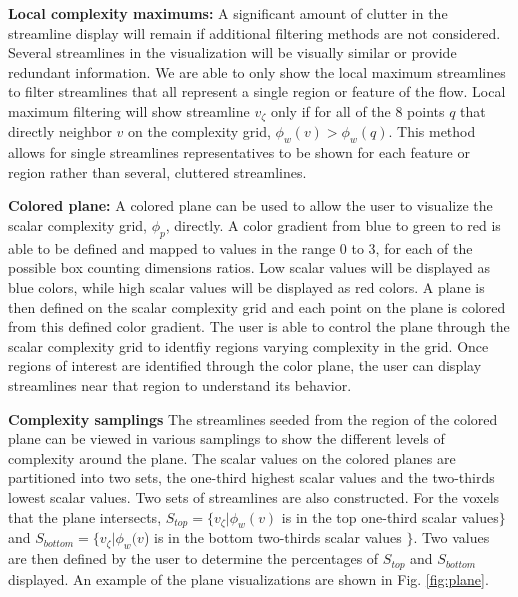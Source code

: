 \documentclass[journal]{vgtc}                %
\begin{document}
\textbf{Local complexity maximums:}
A significant amount of clutter in the streamline display will remain if additional filtering methods are not considered.
Several streamlines in the visualization will be visually similar or provide redundant information.
We are able to only show the local maximum streamlines to filter streamlines that all represent a single region or feature of the flow.
Local maximum filtering will show streamline $v_\zeta$ only if for all of the 8 points $q$ that directly neighbor $v$ on the complexity grid, $\phi_w(v) > \phi_w(q)$.
This method allows for single streamlines representatives to be shown for each feature or region rather than several, cluttered streamlines.

\textbf{Colored plane:}
A colored plane can be used to allow the user to visualize the scalar complexity grid, $\phi_p$, directly.
A color gradient from blue to green to red is able to be defined and mapped to values in the range 0 to 3, for each of the possible box counting dimensions ratios.
Low scalar values will be displayed as blue colors, while high scalar values will be displayed as red colors.
A plane is then defined on the scalar complexity grid and each point on the plane is colored from this defined color gradient.
The user is able to control the plane through the scalar complexity grid to identfiy regions varying complexity in the grid.
Once regions of interest are identified through the color plane, the user can display streamlines near that region to understand its behavior.

\textbf{Complexity samplings}
The streamlines seeded from the region of the colored plane can be viewed in various samplings to show the different levels of complexity around the plane.
The scalar values on the colored planes are partitioned into two sets, the one-third highest scalar values and the two-thirds lowest scalar values.
Two sets of streamlines are also constructed.
For the voxels that the plane intersects, $S_{top} = \{ v_\zeta | \phi_w(v)$ is in the top one-third scalar values$\}$ and $S_{bottom} = \{ v_\zeta | \phi_w(v$) is in the bottom two-thirds scalar values $\}$.
Two values are then defined by the user to determine the percentages of $S_{top}$ and $S_{bottom}$ displayed.
An example of the plane visualizations are shown in Fig. \ref{fig:plane}.
\end{document}
